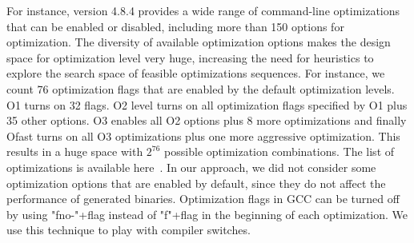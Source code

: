 For instance, version 4.8.4 provides a wide range of command-line optimizations that can be enabled or disabled, including more than 150 options for optimization. The diversity of available optimization options makes the design space for optimization level very huge, increasing the need for heuristics to explore the search space of feasible optimizations sequences.
For instance, we count 76 optimization flags that are enabled by the default optimization levels. O1 turns on 32 flags. O2 level turns on all optimization flags specified by O1 plus 35 other options. O3 enables all O2 options plus 8 more optimizations and finally Ofast turns on all O3 optimizations plus one more aggressive optimization. 
This results in a huge space with $2^{76}$ possible optimization combinations. The list of optimizations is available here~\cite{timmurphy.org}.
In our approach, we did not consider some optimization options that are enabled by default, since they do not affect the performance of generated binaries.
Optimization flags in GCC can be turned off by using "fno-"+flag instead of "f"+flag in the beginning of each optimization. 
We use this technique to play with compiler switches.
\iffalse
